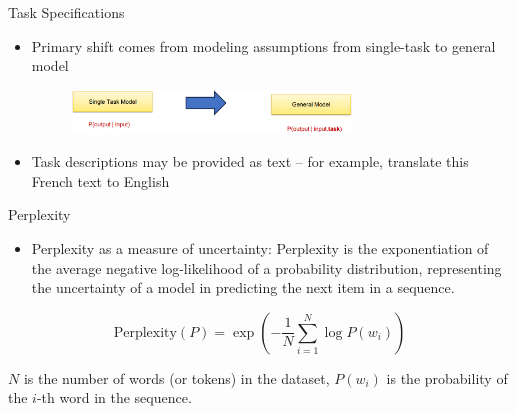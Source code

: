 \documentclass[serif, aspectratio=169]{beamer}
\begin{document}
\begin{frame}{Task Specifications}
    \vspace{0.5cm}
    \begin{itemize}
        \item
            \large{Primary shift comes from modeling assumptions from single-task to general model}\\
            \vspace{0.3cm}
            \hspace{2cm}
            \begin{figure}
            \centering
            \includegraphics[width=0.7\textwidth]{pic/task specification.png}
            \caption{}
            \end{figure}
        \item 
            \large{Task descriptions may be provided as text – for example, translate this French text to English}
    \end{itemize}
\end{frame}

\begin{frame}{Perplexity }
    \vspace{0.5cm}
    \begin{itemize}
        \item
            \large{Perplexity as a measure of uncertainty:} Perplexity is the exponentiation of the average negative log-likelihood of a probability distribution, representing the uncertainty of a model in predicting the next item in a sequence.\\
    \end{itemize}
    \vspace{0.5cm}
    \[
        \text{Perplexity}(P) = \exp\left( -\frac{1}{N} \sum_{i=1}^{N} \log P(w_i) \right)
    \]
    \begin{outline}
        \1 \( N \) is the number of words (or tokens) in the dataset,
        \1 \( P(w_i) \) is the probability of the \( i \)-th word in the sequence.
    \end{outline}
\end{frame}
\end{document}
